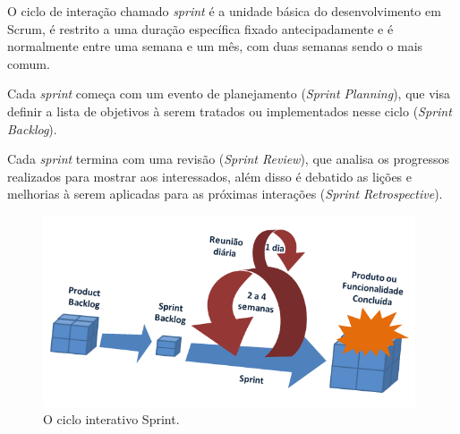 \par O ciclo de interação chamado \emph{sprint} é a unidade básica do desenvolvimento em Scrum, é restrito a uma duração específica fixado antecipadamente e é normalmente entre uma semana e um mês, com duas semanas sendo o mais comum.
\par Cada \emph{sprint} começa com um evento de planejamento (\emph{Sprint Planning}), que visa definir a lista de objetivos à serem tratados ou implementados nesse ciclo (\emph{Sprint Backlog}). 
\par Cada \emph{sprint} termina com uma revisão (\emph{Sprint Review}), que analisa os progressos realizados para mostrar aos interessados, além disso é debatido as lições e melhorias à serem aplicadas para as próximas interações (\emph{Sprint Retrospective}).
\begin{figure}[!htb]
\centering
\includegraphics[width=11cm]{figuras/scrum_process}
\caption{\label{fig:scrum_process}O ciclo interativo Sprint.}
\end{figure}
